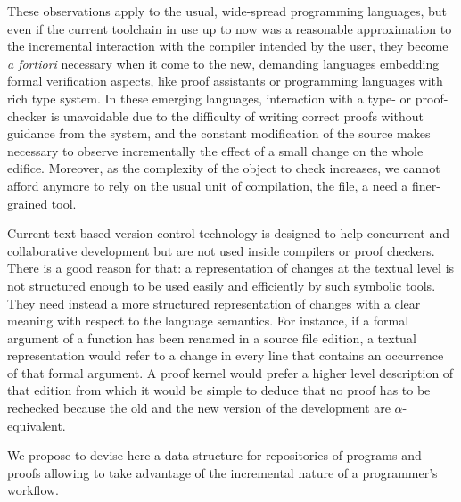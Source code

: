 \documentclass[preprint]{sigplanconf}
\begin{document}
These observations apply to the usual, wide-spread programming
languages, but even if the current toolchain in use up to now was a
reasonable approximation to the incremental interaction with the
compiler intended by the user, they become \emph{a fortiori} necessary
when it come to the new, demanding languages embedding formal
verification aspects, like proof assistants or programming languages
with rich type system. In these emerging languages, interaction with a
type- or proof-checker is unavoidable due to the difficulty of writing
correct proofs without guidance from the system, and the constant
modification of the source makes necessary to observe incrementally
the effect of a small change on the whole edifice. Moreover, as the
complexity of the object to check increases, we cannot afford anymore
to rely on the usual unit of compilation, the file, a need a
finer-grained tool. 

Current text-based version control technology is designed to help
concurrent and collaborative development but are not used inside
compilers or proof checkers. There is a good reason for that: a
representation of changes at the textual level is not structured
enough to be used easily and efficiently by such symbolic tools. They
need instead a more structured representation of changes with a clear
meaning with respect to the language semantics. For instance, if a
formal argument of a function has been renamed in a source file
edition, a textual representation would refer to a change in every
line that contains an occurrence of that formal argument. A proof
kernel would prefer a higher level description of that edition from
which it would be simple to deduce that no proof has to be rechecked
because the old and the new version of the development are
$\alpha$-equivalent.



We propose to devise here a data structure for repositories of
programs and proofs allowing to take advantage of the incremental
nature of a programmer's workflow.
\end{document}
